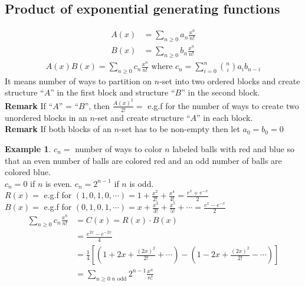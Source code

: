 \documentclass{article}
\theoremstyle{definition}
\newtheorem{ex}{Example}[]
\begin{document}
\subsection{Product of exponential generating functions}
\begin{align*}
    A(x) &= \sum_{n\ge 0} a_n \frac{x^n}{n!} \\ 
    B(x) &= \sum_{n\ge 0} b_n \frac{x^n}{n!}
\end{align*}
\begin{align*}
    A(x)B(x) = \sum_{n\ge 0} c_n \frac{x^n}{n!} \text{ where } 
    c_n = \sum_{i=0}^{n} {n \choose i} a_i b_{n-i}
\end{align*}
It means number of ways to partition on $n$-set into 
two ordered blocks and create structure ``$A$'' in the 
first block and structure ``$B$'' in the second block. \\ 
\textbf{Remark} If ``$A$'' = ``$B$'', then $\frac{A(x)^2}{2!} = $ e.g.f
for the number of ways to create two unordered blocks in an $n$-set and create
structure ``$A$'' in each block.\\ 
\textbf{Remark} If both blocks of an $n$-set has to be non-empty then
let $a_0=b_0=0$ 
\begin{ex}
    $c_n = $ number of ways to color $n$ labeled balls with red and blue
    so that an even number of balls are colored red and an odd number of balls
    are colored blue.\\ 
    $c_n = 0$ if $n$ is even. $c_n = 2^{n-1}$ if $n$ is odd.\\
    $R(x) = $ e.g.f for $(1,0,1,0,\cdots) = 1 + \frac{x^2}{2!} + \frac{x^4}{4!} = 
    \frac{e^x + e^{-x}}{2}$\\ 
    $B(x) = $ e.g.f for 
    $(0,1,0,1,\cdots) = x + \frac{x^3}{3!} + \frac{x^5}{5!} + \cdots = 
    \frac{e^x - e^{-x}}{2}$
    \begin{align*}
        \sum_{n\ge 0} c_n \frac{x^n}{n!} &= C(x) = R(x)\cdot B(x) \\ 
        &= \frac{e^{2x} - e^{-2x}}{4} \\ 
        &= \frac{1}{4} \left[\left(1 + 2x + \frac{(2x)^2}{2!} + \cdots \right) - 
        \left(1 - 2x + \frac{(2x)^2}{2!} - \cdots \right)\right]\\ 
        &= \sum_{n\ge 0 \; n \text{ odd}} 2^{n-1} \frac{x^n}{n!}
    \end{align*}
\end{ex}
\end{document}
